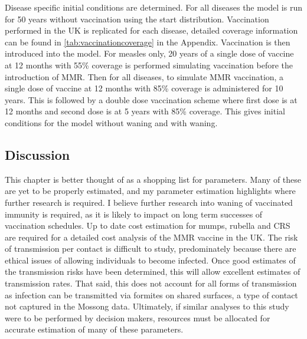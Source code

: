 \documentclass[a4paper,11pt] {scrartcl}
\begin{document}
Disease specific initial conditions are determined. For all diseases the model is run for 50 years without vaccination using the start distribution. Vaccination performed in the UK is replicated for each disease, detailed coverage information can be found in \autoref{tab:vaccinationcoverage} in the Appendix. Vaccination is then introduced into the model. For measles only, 20 years of a single dose of vaccine at 12 months with 55\% coverage is performed simulating vaccination before the introduction of MMR. Then for all diseases, to simulate MMR vaccination, a single dose of vaccine at 12 months with 85\% coverage is administered for 10 years. This is followed by a double dose vaccination scheme where first dose is at 12 months and second dose is at 5 years with 85\% coverage. This gives initial conditions for the model without waning and with waning.

\subsection{Discussion}
\label{subsec:estimateparametersdiscussion}
This chapter is better thought of as a shopping list for parameters. Many of these are yet to be properly estimated, and my parameter estimation highlights where further research is required. I believe further research into waning of vaccinated immunity is required, as it is likely to impact on long term successes of vaccination schedules. Up to date cost estimation for mumps, rubella and CRS are required for a detailed cost analysis of the MMR vaccine in the UK. The risk of transmission per contact is difficult to study, predominately because there are ethical issues of allowing individuals to become infected. Once good estimates of the transmission risks have been determined, this will allow excellent estimates of transmission rates. That said, this does not account for all forms of transmission as infection can be transmitted via formites on shared surfaces, a type of contact not captured in the Mossong data. Ultimately, if similar analyses to this study were to be performed by decision makers, resources must be allocated for accurate estimation of many of these parameters.

\newpage
\end{document}

